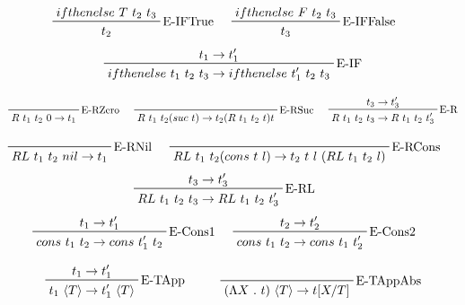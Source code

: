 \documentclass[12pt, titlepage, a4paper]{article}
\begin{document}
\begin{displaymath}
    \prftree[r]{E-IFTrue}{ifthenelse \ T \ t_2 \ t_3}{t_2} \hspace{0.5cm}
    \prftree[r]{E-IFFalse}{ifthenelse \ F \ t_2 \ t_3}{t_3} \hspace{0.5cm}
\end{displaymath}
\begin{displaymath}
    \prftree[r]{E-IF}{t_1 \rightarrow t_1'}{ifthenelse \ t_1 \ t_2 \ t_3 \rightarrow ifthenelse \ t_1' \ t_2 \ t_3}
\end{displaymath}

\begin{displaymath}
    \prftree[r]{E-RZero}{R \ t_1 \ t_2 \ 0 \rightarrow t_1} \hspace{0.5cm}
    \prftree[r]{E-RSuc}{R \ t_1 \ t_2 (suc \ t) \rightarrow t_2 (R \ t_1 \ t_2 \ t) t} \hspace{0.5cm}
    \prftree[r]{E-R}{t_3 \rightarrow t_3'}{R \ t_1 \ t_2 \ t_3 \rightarrow R \ t_1 \ t_2 \ t_3'}
\end{displaymath}


\begin{displaymath}
    \prftree[r]{E-RNil}{RL \ t_1 \ t_2 \ nil \rightarrow t_1} \hspace{0.5cm}
    \prftree[r]{E-RCons}{RL \ t_1 \ t_2 (cons \ t \ l) \rightarrow t_2 \ t \ l \ (RL \ t_1 \ t_2 \ l)} \hspace{0.5cm}
\end{displaymath}
\begin{displaymath}
    \prftree[r]{E-RL}{t_3 \rightarrow t_3'}{RL \ t_1 \ t_2 \ t_3 \rightarrow RL \ t_1 \ t_2 \ t_3'} \hspace{0.5cm}
\end{displaymath}
\begin{displaymath}
  \prftree[r]{E-Cons1}{t_1 \rightarrow t_1'}{cons \ t_1 \ t_2 \rightarrow cons \ t_1' \ t_2} \hspace{0.5cm}
  \prftree[r]{E-Cons2}{t_2 \rightarrow t_2'}{cons \ t_1 \ t_2 \rightarrow cons \ t_1 \ t_2'} \hspace{0.5cm}
\end{displaymath}


\begin{displaymath}
    \prftree[r]{E-TApp}{t_1 \rightarrow t_1'}{t_1 \ \langle T \rangle \rightarrow t_1' \ \langle T \rangle} \hspace{1cm}
    \prftree[r]{E-TAppAbs}{(\Lambda X \ . \ t)\ \langle T \rangle \rightarrow t[X/T]}
\end{displaymath}
\end{document}
